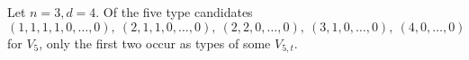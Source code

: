 \begin{example}
Let $n=3, d=4$. Of the five type candidates
\[
(1,1,1,1,0,\dotsc,0),\ (2,1,1,0,\dotsc,0),\ (2,2,0,\dotsc,0),\ (3,1,0,\dotsc,0),\ (4,0,\dotsc,0)
\]
for $V_5$, only the first two occur as types of some $V_{5,t}$.
\end{example}
